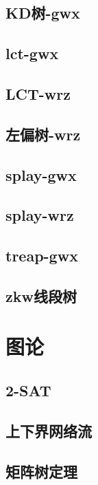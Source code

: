 \documentclass[titlepage,a4paper,10pt]{article}
\begin{document}
\begin{spacing}{0.8}
			\subsection{KD树-gwx}
				
			\subsection{lct-gwx}
				
			\subsection{LCT-wrz}
				
			\subsection{左偏树-wrz}
				
			\subsection{splay-gwx}
				
			\subsection{splay-wrz}
				
			\subsection{treap-gwx}
				
			\subsection{zkw线段树}
				
		\section{图论}
			\subsection{2-SAT}
				
			\subsection{上下界网络流}
				
			\subsection{矩阵树定理}
				

\end{spacing}
\end{document}
